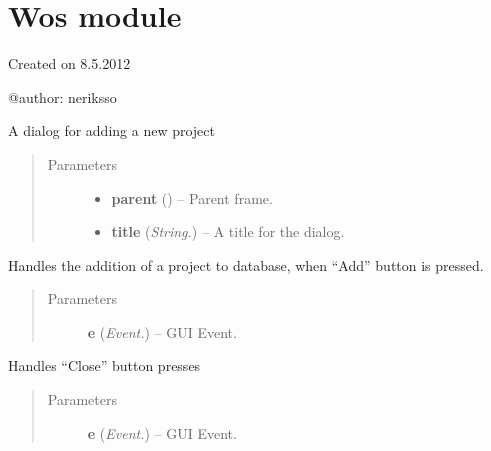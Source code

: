 \documentclass[letterpaper,10pt,english]{sphinxmanual}
\begin{document}
\section{Wos module}
\label{api:wos-module}\label{api:module-wos}
Created on 8.5.2012

@author: neriksso

\begin{fulllineitems}
\label{api:wos.AddProjectDialog}
A dialog for adding a new project
\begin{quote}\begin{description}
\item[{Parameters}] \leavevmode\begin{itemize}
\item {} 
\textbf{parent} () -- Parent frame.

\item {} 
\textbf{title} (\emph{String.}) -- A title for the dialog.

\end{itemize}

\end{description}\end{quote}

\begin{fulllineitems}
\label{api:wos.AddProjectDialog.OnAdd}
Handles the addition of a project to database, when ``Add'' button is pressed.
\begin{quote}\begin{description}
\item[{Parameters}] \leavevmode
\textbf{e} (\emph{Event.}) -- GUI Event.

\end{description}\end{quote}

\end{fulllineitems}


\begin{fulllineitems}
\label{api:wos.AddProjectDialog.OnClose}
Handles ``Close'' button presses
\begin{quote}\begin{description}
\item[{Parameters}] \leavevmode
\textbf{e} (\emph{Event.}) -- GUI Event.

\end{description}\end{quote}

\end{fulllineitems}


\end{fulllineitems}
\end{document}
